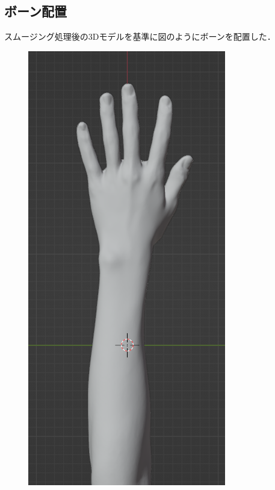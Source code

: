 \documentclass{ltjsreport}
\begin{document}
		\subsection{ボーン配置}
			スムージング処理後の3Dモデルを基準に図のようにボーンを配置した．
			\begin{figure}[H]
			\centering
			\begin{minipage}{0.3\columnwidth}
			\centering
			\includegraphics[width = \columnwidth]{../figs/handmeshLat.png}

\end{minipage}
\end{figure}
\end{document}
